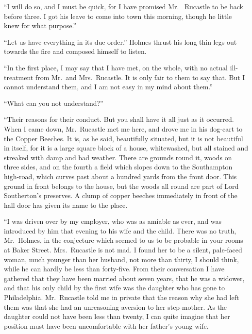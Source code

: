“I will do so, and I must be quick, for I have promised Mr.\ %
Rucastle to be back before three. I got his leave to come
into town this morning, though he little knew for what
purpose.”

“Let us have everything in its due order.” Holmes thrust
his long thin legs out towards the fire and composed himself
to listen.

“In the first place, I may say that I have met, on the whole,
with no actual ill-treatment from Mr.~and Mrs.~Rucastle. It
is only fair to them to say that. But I cannot understand
them, and I am not easy in my mind about them.”

“What can you not understand?”

“Their reasons for their conduct. But you shall have it all
just as it occurred. When I came down, Mr.~Rucastle met me
here, and drove me in his dog-cart to the Copper Beeches. It
is, as he said, beautifully situated, but it is not beautiful in
itself, for it is a large square block of a house, whitewashed,
but all stained and streaked with damp and bad weather.
There are grounds round it, woods on three sides, and on the
fourth a field which slopes down to the Southampton high-road,
which curves past about a hundred yards from the front door.
This ground in front belongs to the house, but the woods all
round are part of Lord Southerton’s preserves. A clump of
copper beeches immediately in front of the hall door has given
its name to the place.

“I was driven over by my employer, who was as amiable as
ever, and was introduced by him that evening to his wife and
the child. There was no truth, Mr.~Holmes, in the conjecture
which seemed to us to be probable in your rooms at Baker
Street. Mrs.~Rucastle is not mad. I found her to be a silent,
pale-faced woman, much younger than her husband, not more
than thirty, I should think, while he can hardly be less than
forty-five. From their conversation I have gathered that they
have been married about seven years, that he was a widower,
and that his only child by the first wife was the daughter who
has gone to Philadelphia. Mr.~Rucastle told me in private
that the reason why she had left them was that she had an
unreasoning aversion to her step-mother. As the daughter
could not have been less than twenty, I can quite imagine that
her position must have been uncomfortable with her father’s
young wife.

